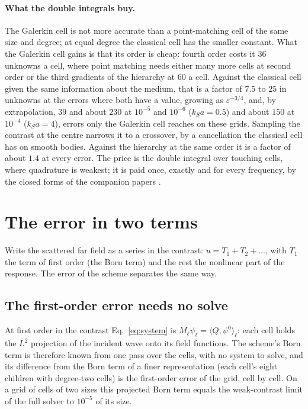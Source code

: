 \documentclass[11pt,a4paper]{article}
\begin{document}
\paragraph{What the double integrals buy.} The Galerkin cell is not more accurate than a point-matching
cell of the same size and degree; at equal degree the classical cell has the smaller constant. What the
Galerkin cell gains is that its order is cheap: fourth order costs it $36$ unknowns a cell, where point
matching needs either many more cells at second order or the third gradients of the hierarchy at $60$ a
cell. Against the classical cell given the same information about the medium, that is a factor of $7.5$ to
$25$ in unknowns at the errors where both have a value, growing as $\varepsilon^{-3/4}$, and, by
extrapolation, $39$ and about $230$ at $10^{-5}$ and $10^{-6}$ ($k_Sa=0.5$) and about $150$ at $10^{-4}$
($k_Sa=4$), errors only the Galerkin cell reaches on these grids. Sampling the
contrast at the centre narrows it to a crossover, by a cancellation the classical cell has on smooth
bodies. Against the hierarchy at the same order it is a factor of about $1.4$ at every error. The price is
the double integral over touching cells, where quadrature is weakest; it is paid once, exactly and for
every frequency, by the closed forms of the companion papers \citep{NestorLegendre2026,NestorCoupling2026}.

\FloatBarrier

\section{The error in two terms}\label{sec:twoterm}

Write the scattered far field as a series in the contrast: $u=T_1+T_2+\dots$, with $T_1$ the term of
first order (the Born term) and the rest the nonlinear part of the response. The error of the scheme
separates the same way.

\subsection{The first-order error needs no solve}\label{sec:born}

At first order in the contrast Eq.~\eqref{eq:system} is $M_\ell\psi_\ell=\langle Q,\psi^0\rangle_\ell$:
each cell holds the $L^2$ projection of the incident wave onto its field functions. The scheme's Born
term is therefore known from one pass over the cells, with no system to solve, and its difference from
the Born term of a finer representation (each cell's eight children with degree-two cells) is the
first-order error of the grid, cell by cell. On a grid of cells of two sizes this projected Born term
equals the weak-contrast limit of the full solver to $10^{-5}$ of its size.
\end{document}
